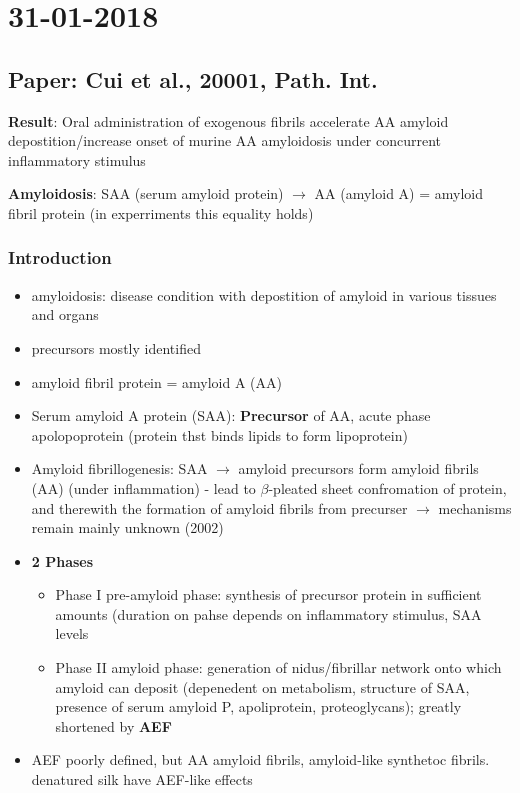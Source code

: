 \documentclass[fleqn]{article}\usepackage{caption}
\begin{document}
\section{31-01-2018}
\subsection{Paper: Cui et al., 20001,  Path. Int.}
\textbf{Result}: Oral administration of exogenous fibrils accelerate AA amyloid depostition/increase onset of murine AA amyloidosis under concurrent inflammatory stimulus

\textbf{Amyloidosis}: SAA (serum amyloid protein) $\rightarrow$ AA (amyloid A) = amyloid fibril protein (in experriments this equality holds)
\subsubsection{Introduction}
\begin{itemize}
\item amyloidosis: disease condition with depostition of amyloid in various tissues and organs
\item precursors mostly identified
\item amyloid fibril protein = amyloid A (AA) 
\item Serum amyloid A protein (SAA):  \textbf{Precursor}  of AA, acute phase apolopoprotein (protein thst binds lipids to form lipoprotein)
\item Amyloid fibrillogenesis: SAA $\rightarrow$ amyloid
precursors form amyloid fibrils (AA) (under inflammation) - lead to $\beta$-pleated sheet confromation of protein, and therewith the formation of amyloid fibrils from precurser $\rightarrow$ mechanisms remain mainly unknown (2002)

 
\item \textbf{2 Phases}
\begin{itemize}
\item Phase I pre-amyloid phase: synthesis of precursor protein in sufficient amounts (duration on pahse depends on inflammatory stimulus, SAA levels
\item Phase II amyloid phase: generation of nidus/fibrillar network onto which amyloid can deposit (depenedent on metabolism, structure of SAA, presence of serum amyloid P, apoliprotein, proteoglycans); greatly shortened by \textbf{AEF}
\end{itemize}
\item AEF poorly defined, but AA amyloid fibrils, amyloid-like synthetoc fibrils. denatured silk have AEF-like effects
\end{itemize}
\end{document}
